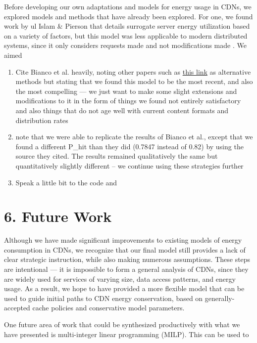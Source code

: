 \documentclass[
	a4paper, %
	10pt, %
	unnumberedsections, %
	twoside, %
]{LTJournalArticle}
\begin{document}
Before developing our own adaptations and models for energy usage in CDNs, we explored models and methods that have already been explored. For one, we found work by ul Islam \& Pierson that details surrogate server energy utilization based on a variety of factors, but this model was less applicable to modern distributed systems, since it only considers requests made and not modifications made \cite{ulIslam2012}. We aimed
\begin{enumerate}
    \item Cite Bianco et al. heavily, noting other papers such as \href{https://link.springer.com/chapter/10.1007/978-3-642-32606-6\_6}{this link} as alternative methods but stating that we found this model to be the most recent, and also the most compelling --- we just want to make some slight extensions and modifications to it in the form of things we found not entirely satisfactory and also things that do not age well with current content formats and distribution rates
    \item note that we were able to replicate the results of Bianco et al., except that we found a different P\_hit than they did (0.7847 instead of 0.82) by using the source they cited. The results remained qualitatively the same but quantitatively slightly different -- we continue using these strategies further
    \item Speak a little bit to the code and
\end{enumerate}

\section{6. Future Work}
Although we have made significant improvements to existing models of energy consumption in CDNs, we recognize that our final model still provides a lack of clear strategic instruction, while also making numerous assumptions. These steps are intentional --- it is impossible to form a general analysis of CDNs, since they are widely used for services of varying size, data access patterns, and energy usage. As a result, we hope to have provided a more flexible model that can be used to guide initial paths to CDN energy conservation, based on generally-accepted cache policies and conservative model parameters. 

One future area of work that could be synthesized productively with what we have presented is multi-integer linear programming (MILP). This can be used to 

\end{document}
